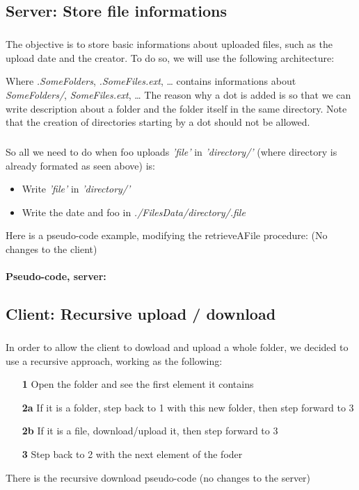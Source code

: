 \documentclass[12pt,a4paper,twoside]{article}
\begin{document}
		\subsection{Server: Store file informations} %
			\subparagraph*{}
				The objective is to store basic informations about uploaded files, such as the upload date and the creator.
				To do so, we will use the following architecture:
				\begin{samepage}
					
				\end{samepage}
				Where \textit{.SomeFolders}, \textit{.SomeFiles.ext}, \ldots{} contains informations about \textit{SomeFolders/}, \textit{SomeFiles.ext}, \ldots{}
				The reason why a dot is added is so that we can write description about a folder and the folder itself in the same directory. Note that the creation of directories starting by a dot should not be allowed.
			\subparagraph*{}
				So all we need to do when foo uploads \textit{'file'} in \textit{'directory/'} (where directory is already formated as seen above) is:
				\begin{itemize}
					\item{} Write \textit{'file'} in \textit{'directory/'}
					\item{} Write the date and foo in \textit{./FilesData/directory/.file}
				\end{itemize}
				Here is a pseudo-code example, modifying the retrieveAFile procedure: (No changes to the client)
			\paragraph*{Pseudo-code, server:}
				
				
		\subsection{Client: Recursive upload / download} %
			\subparagraph*{}
				In order to allow the client to dowload and upload a whole folder, we decided to use a recursive approach, working as the following:
				\begin{itemize}
					\item[\textbf{1 }]{} Open the folder and see the first element it contains
					\item[\textbf{2a}]{} If it is a folder, step back to 1 with this new folder, then step forward to 3
					\item[\textbf{2b}]{} If it is a file, download/upload it, then step forward to 3
					\item[\textbf{3 }]{} Step back to 2 with the next element of the foder
				\end{itemize}
				There is the recursive download pseudo-code (no changes to the server)
\end{document}
